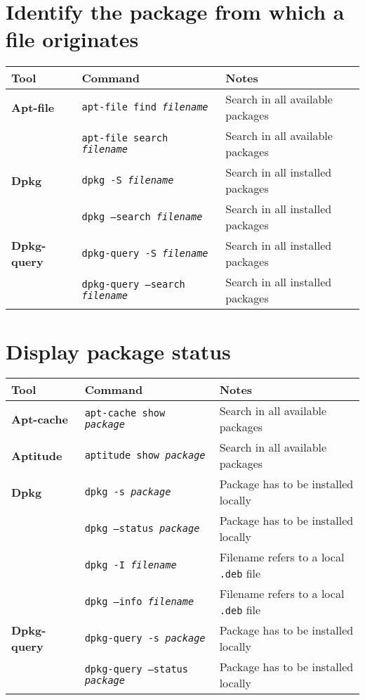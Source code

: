 \documentclass[10pt]{article}
\begin{document}
\section{Identify the package from which a file originates}
\begin{tabular}{ p{3.5cm} p{9cm} p{11cm}}
  \hline
  \rowcolor{Gray}
  \textbf{Tool} & \textbf{Command} & \textbf{Notes} \\
  \hline 
  \textbf{Apt-file} & \texttt{apt-file find \textit{filename}} & Search in all available packages\\
  \rowcolor{Gray}
  & \texttt{apt-file search \textit{filename}} & Search in all available packages\\
  \textbf{Dpkg} & \texttt{dpkg -S \textit{filename}} & Search in all installed packages\\
  \rowcolor{Gray}
  & \texttt{dpkg --search \textit{filename}} & Search in all installed packages \\
  \textbf{Dpkg-query} & \texttt{dpkg-query -S \textit{filename}} & Search in all installed packages\\
  \rowcolor{Gray}
  & \texttt{dpkg-query --search \textit{filename}} & Search in all installed packages \\
  \hline
\end{tabular}

\newpage

\cheatsheet

\section{Display package status}
\begin{tabular}{ p{3.5cm} p{9cm} p{11cm}}
  \hline
  \rowcolor{Gray}
  \textbf{Tool} & \textbf{Command} & \textbf{Notes} \\
  \hline 
  \textbf{Apt-cache} & \texttt{apt-cache show \textit{package}} & Search in all available packages\\
  \rowcolor{Gray}
  \textbf{Aptitude} & \texttt{aptitude show \textit{package}} & Search in all available packages\\
  \textbf{Dpkg} & \texttt{dpkg -s \textit{package}} & Package has to be installed locally\\
  \rowcolor{Gray}
  & \texttt{dpkg --status \textit{package}} & Package has to be installed locally\\
  & \texttt{dpkg -I \textit{filename}} & Filename refers to a local \texttt{.deb} file \\
  \rowcolor{Gray}
  & \texttt{dpkg --info \textit{filename}} & Filename refers to a local \texttt{.deb} file \\
  \textbf{Dpkg-query} & \texttt{dpkg-query -s \textit{package}} & Package has to be installed locally\\
  \rowcolor{Gray}
  & \texttt{dpkg-query --status \textit{package}} & Package has to be installed locally \\
  \hline
\end{tabular}
\end{document}
